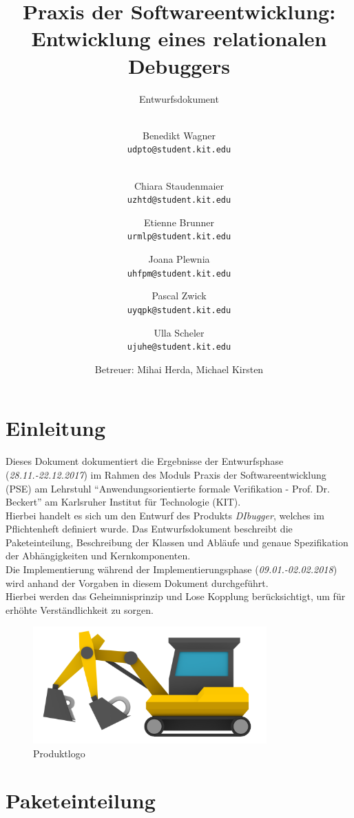 ﻿\documentclass[parskip=full]{scrartcl}
\title{
	\vspace{2cm}
	\myfont 
	Praxis der Softwareentwicklung:\\ 
	Entwicklung eines relationalen Debuggers\\
}
\subtitle{
	\vspace{1cm}
	\myfont
	Entwurfsdokument
}
\author{
	\vspace{1cm} \\
	Benedikt Wagner\\
	\texttt{udpto@student.kit.edu}
	\and \vspace{1cm} \\ Chiara Staudenmaier\\
	\texttt{uzhtd@student.kit.edu}
	\and Etienne Brunner\\
	\texttt{urmlp@student.kit.edu}
	\and Joana Plewnia\\
	\texttt{uhfpm@student.kit.edu} 
	\and Pascal Zwick\\
	\texttt{uyqpk@student.kit.edu}
	\and Ulla Scheler\\
	\texttt{ujuhe@student.kit.edu}
	\vspace{1cm}
	\and Betreuer: Mihai Herda, Michael Kirsten
	\vspace{4cm}
}
\begin{document}
\clearpage
\maketitle
{}
\newpage

\tableofcontents
\newpage
{}
\section{Einleitung}
Dieses Dokument dokumentiert die Ergebnisse der Entwurfsphase (\textit{28.11.-22.12.2017}) im Rahmen
des Moduls Praxis der Softwareentwicklung (PSE) am Lehrstuhl \enquote{Anwendungsorientierte formale Verifikation - Prof. Dr. Beckert} am Karlsruher Institut für Technologie (KIT).\\
Hierbei handelt es sich um den Entwurf des Produkts \textit{DIbugger}, welches im Pflichtenheft definiert wurde. 
Das Entwurfsdokument beschreibt die Paketeinteilung, Beschreibung der Klassen und Abläufe und genaue Spezifikation der Abhängigkeiten und Kernkomponenten. 
\\Die Implementierung während der Implementierungsphase (\textit{09.01.-02.02.2018}) wird anhand der Vorgaben in diesem Dokument durchgeführt. \\
Hierbei werden das Geheimnisprinzip und Lose Kopplung berücksichtigt, um für erhöhte Verständlichkeit
zu sorgen. %

\vspace{1cm}
\begin{figure}[!h]
\centering
\includegraphics[width=0.8\textwidth]{../Plichtenheft/logo_nongi.png}
\caption{Produktlogo}
\end{figure}

\newpage


\section{Paketeinteilung} %
\end{document}
